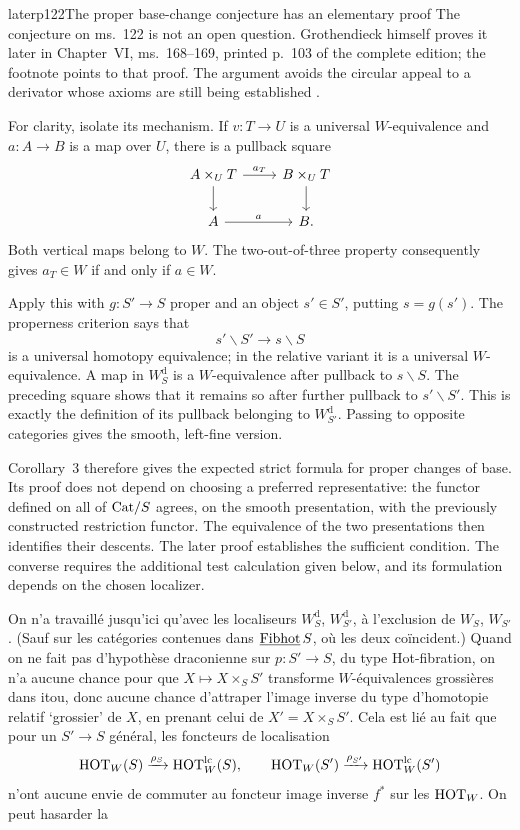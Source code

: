 \begin{dcomment}{later}{p122}{The proper base-change conjecture has an elementary proof}
The conjecture on ms.~122 is not an open question. Grothendieck himself proves it later in Chapter~VI, ms.~168--169, printed p.~103 of the complete edition; the footnote points to that proof. The argument avoids the circular appeal to a derivator whose axioms are still being established \citep[ms.~168--169]{Grothendieck1990VI}.

For clarity, isolate its mechanism. If $v:T\to U$ is a universal $W$-equivalence and $a:A\to B$ is a map over $U$, there is a pullback square
\[
\begin{tikzcd}
A\times_U T\arrow[r,"a_T"]\arrow[d] & B\times_U T\arrow[d]\\
A\arrow[r,"a"] & B.
\end{tikzcd}
\]
Both vertical maps belong to $W$. The two-out-of-three property consequently gives $a_T\in W$ if and only if $a\in W$.

Apply this with $g:S'\to S$ proper and an object $s'\in S'$, putting $s=g(s')$. The properness criterion says that
\[
 s'\backslash S'\longrightarrow s\backslash S
\]
is a universal homotopy equivalence; in the relative variant it is a universal $W$-equivalence. A map in $W_S^{\mathrm d}$ is a $W$-equivalence after pullback to $s\backslash S$. The preceding square shows that it remains so after further pullback to $s'\backslash S'$. This is exactly the definition of its pullback belonging to $W_{S'}^{\mathrm d}$. Passing to opposite categories gives the smooth, left-fine version.

Corollary~3 therefore gives the expected strict formula for proper changes of base. Its proof does not depend on choosing a preferred representative: the functor defined on all of $\mathrm{Cat}/S$ agrees, on the smooth presentation, with the previously constructed restriction functor. The equivalence of the two presentations then identifies their descents. The later proof establishes the sufficient condition. The converse requires the additional test calculation given below, and its formulation depends on the chosen localizer.
\end{dcomment}


On n'a travaillé jusqu'ici qu'avec les localiseurs $W_S^{\mathrm{d}}$, $W_{S'}^{\mathrm{d}}$, à l'exclusion de $W_S$, $W_{S'}$. (Sauf sur les catégories contenues dans $\underline{\mathrm{Fibhot}}\,S$, où les deux coïncident.) Quand on ne fait pas d'hypothèse draconienne sur $p : S' \longrightarrow S$, du type Hot-fibration, on n'a aucune chance pour que $X \longmapsto X \times_S S'$ transforme $W$-équivalences grossières dans itou, donc aucune chance d'attraper l'image inverse du type d'homotopie relatif `grossier' de $X$, en prenant celui de $X' = X \times_S S'$. Cela est lié au fait que pour un $S' \longrightarrow S$ général, les foncteurs de localisation
\[
\mathrm{HOT}_W(S) \xrightarrow{\rho_S} \mathrm{HOT}_W^{\mathrm{lc}}(S), \qquad \mathrm{HOT}_W(S') \xrightarrow{\rho_{S'}} \mathrm{HOT}_W^{\mathrm{lc}}(S')
\]
n'ont aucune envie de commuter au foncteur image inverse $f^*$ sur les $\mathrm{HOT}_W$. On peut hasarder la

